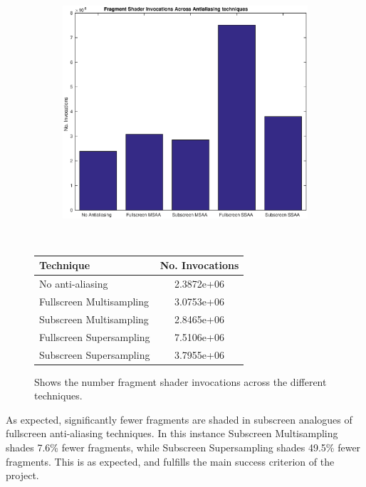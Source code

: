 \documentclass[12pt,a4paper,twoside,openright]{report}
\begin{document}
\begin{figure}[tbh]

 
\begin{subfigure}{0.5\textwidth}
\includegraphics[width=1.0\linewidth]{figs/fsInvocations.eps}
\end{subfigure}
~
\begin{tabular}{l|c}
Technique   & No. Invocations \\ 
\hline
No anti-aliasing      & 2.3872e+06 \\
Fullscreen Multisampling     & 3.0753e+06 \\
Subscreen Multisampling    &  2.8465e+06  \\
Fullscreen Supersampling      &  7.5106e+06   \\
Subscreen Supersampling    &  3.7955e+06  \\
\end{tabular}
 
\caption{Shows the number fragment shader invocations across the different techniques.}
\end{figure}

\noindent As expected, significantly fewer fragments are shaded in subscreen analogues of fullscreen anti-aliasing techniques. In this instance Subscreen Multisampling shades 7.6\% fewer fragments, while Subscreen Supersampling shades 49.5\% fewer fragments. This is as expected, and fulfills the main success criterion of the project.

\clearpage
\end{document}
